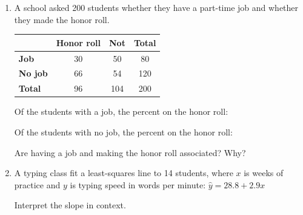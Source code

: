 \documentclass[12pt]{article}
\begin{document}

\vspace{0.12in}

\begin{enumerate}[leftmargin=1.9em, itemsep=0.2in]

  \item \begin{minipage}[t]{0.46\linewidth}\raggedright
        A school asked 200 students whether they have a part-time job and whether they made
        the honor roll.
        \end{minipage}\hfill
        \begin{minipage}[t]{0.5\linewidth}
        \centering\small
        \renewcommand{\arraystretch}{1.2}
        \begin{tabular}[t]{@{} l | c c | c @{}}
         & \textbf{Honor roll} & \textbf{Not} & \textbf{Total} \\ \hline
        \textbf{Job} & 30 & 50 & 80 \\
        \textbf{No job} & 66 & 54 & 120 \\ \hline
        \textbf{Total} & 96 & 104 & 200 \\
        \end{tabular}
        \end{minipage}

        \vspace{12pt}
        Of the students with a job, the percent on the honor roll: 

        \vspace{12pt}
        Of the students with no job, the percent on the honor roll: 

        \vspace{12pt}
        Are having a job and making the honor roll associated? Why?\\[16pt]

  \item A typing class fit a least-squares line to 14 students, where $x$ is weeks of practice
        and $y$ is typing speed in words per minute: \quad $\hat{y} = 28.8 + 2.9x$

        \vspace{12pt}
        Interpret the slope in context.\\[16pt]


\end{enumerate}
\end{document}
